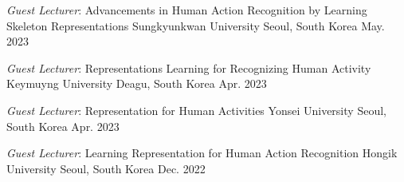 \cventry
{\textit{Guest Lecturer}: Advancements in Human Action Recognition by Learning Skeleton Representations}
{Sungkyunkwan University}
{Seoul, South Korea}
{May. 2023}
{}
\vspace{-1em}


\cventry
{\textit{Guest Lecturer}: Representations Learning for Recognizing Human Activity}
{Keymuyng University}
{Deagu, South Korea}
{Apr. 2023}
{}


\vspace{-1em}
\cventry
{\textit{Guest Lecturer}: Representation for Human Activities}
{Yonsei University}
{Seoul, South Korea}
{Apr. 2023}
{}

\vspace{-1em}
\cventry
{\textit{Guest Lecturer}: Learning Representation for Human Action Recognition}
{Hongik University}
{Seoul, South Korea}
{Dec. 2022}
{}
\vspace{-1em}

